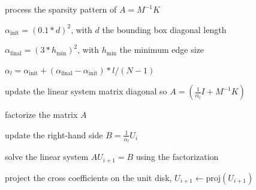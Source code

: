 \documentclass[AMA,STIX1COL]{WileyNJD-v2}
\newcommand{\surface}{\ensuremath{\mathcal{S}}}
\begin{document}
{\begin{algorithm}
\begin{algorithmic}
\State process the sparsity pattern of $A = M^{-1} K$ 


\State $\alpha_\text{init} = (0.1 * d)^2$, with $d$ the bounding box diagonal length \

\State $\alpha_\text{final} = (3 * h_\text{min})^2$, with $h_\text{min}$ the minimum edge size \

   \State $\alpha_l = \alpha_\text{init} + (\alpha_\text{final}-\alpha_\text{init}) * l / (N-1)$

   \State update the linear system matrix diagonal so $A = (\frac{1}{\alpha_l} I + M^{-1} K)$

   \State factorize the matrix $A$ 

       \State update the right-hand side $B=\frac{1}{\alpha_l} U_{i}$

       \State solve the linear system $A U_{i+1} = B$ using the factorization 

       \State project the cross coefficients on the unit disk, $U_{i+1} \leftarrow \text{proj}(U_{i+1})$
   \EndWhile
\EndFor

\end{algorithmic}
\label{algo:crossfield}
\end{algorithm}

% 
% 
% 
% 
% 
% 
% 
% 
% 
% 
% 

}
\end{document}
